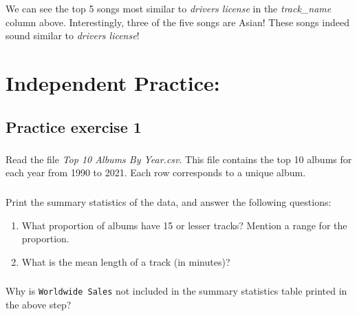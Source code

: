 \documentclass[
  letterpaper,
  DIV=11,
  numbers=noendperiod]{scrreprt}
\providecommand{\tightlist}{%
  \setlength{\itemsep}{0pt}\setlength{\parskip}{0pt}}\usepackage{longtable,booktabs,array}
\begin{document}
We can see the top 5 songs most similar to \emph{drivers license} in the
\emph{track\_name} column above. Interestingly, three of the five songs
are Asian! These songs indeed sound similar to \emph{drivers license}!

\hypertarget{independent-practice-1}{%
\section{Independent Practice:}\label{independent-practice-1}}

\hypertarget{practice-exercise-1-2}{%
\subsection{Practice exercise 1}\label{practice-exercise-1-2}}

\hypertarget{section-18}{%
\subsubsection{}\label{section-18}}

Read the file \emph{Top 10 Albums By Year.csv}. This file contains the
top 10 albums for each year from 1990 to 2021. Each row corresponds to a
unique album.

\hypertarget{section-19}{%
\subsubsection{}\label{section-19}}

Print the summary statistics of the data, and answer the following
questions:

\begin{enumerate}
\def\labelenumi{\arabic{enumi}.}
\tightlist
\item
  What proportion of albums have 15 or lesser tracks? Mention a range
  for the proportion.
\item
  What is the mean length of a track (in minutes)?
\end{enumerate}

\hypertarget{section-20}{%
\subsubsection{}\label{section-20}}

Why is \texttt{Worldwide\ Sales} not included in the summary statistics
table printed in the above step?

\hypertarget{section-21}{%
\subsubsection{}\label{section-21}}
\end{document}
